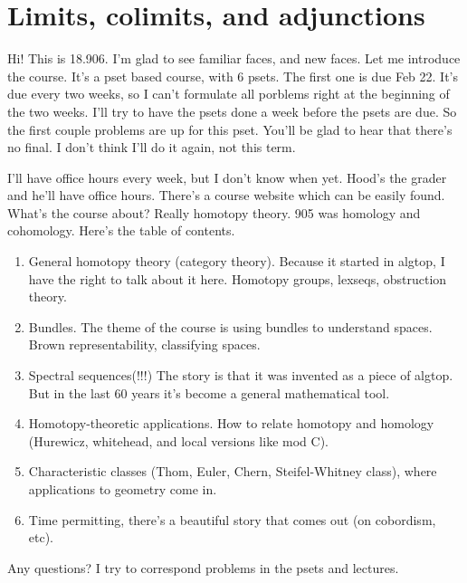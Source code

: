 \section{Limits, colimits, and adjunctions}\label{906}
Hi! This is 18.906. I'm glad to see familiar faces, and new faces. Let me introduce the course. It's a pset based course, with 6 psets. The first one is due Feb 22. It's due every two weeks, so I can't formulate all porblems right at the beginning of the two weeks. I'll try to have the psets done a week before the psets are due. So the first couple problems are up for this pset. You'll be glad to hear that there's no final. I don't think I'll do it again, not this term.

I'll have office hours every week, but I don't know when yet. Hood's the grader and he'll have office hours. There's a course website which can be easily found. What's the course about? Really homotopy theory. 905 was homology and cohomology. Here's the table of contents.
\begin{enumerate}
    \item General homotopy theory (category theory). Because it started in algtop, I have the right to talk about it here. Homotopy groups, lexseqs, obstruction theory.
    \item Bundles. The theme of the course is using bundles to understand spaces. Brown representability, classifying spaces.
    \item Spectral sequences(!!!) The story is that it was invented as a piece of algtop. But in the last 60 years it's become a general mathematical tool.
    \item Homotopy-theoretic applications. How to relate homotopy and homology (Hurewicz, whitehead, and local versions like mod C).
    \item Characteristic classes (Thom, Euler, Chern, Steifel-Whitney class), where applications to geometry come in.
    \item Time permitting, there's a beautiful story that comes out (on cobordism, etc).
\end{enumerate}
Any questions? I try to correspond problems in the psets and lectures.
